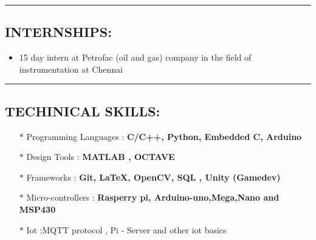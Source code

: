 \documentclass[10pts]{report}
\begin{document}
\par\noindent\rule{\textwidth}{0.1pt}
\begin{flushleft}
         \section*{INTERNSHIPS:}
              \begin{itemize}
                 \item 15 day intern at Petrofac (oil and gas) company in the field of instrumentation at Chennai
               \end{itemize}     
\end{flushleft}

\par\noindent\rule{\textwidth}{0.1pt}
\begin{flushleft}
         \section*{TECHINICAL SKILLS:}
              \begin{itemize}
                 \item[$\ast$]        Programming Languages       :  \textbf {C/C++, Python, Embedded C, Arduino} \\
                 \item[$\ast$]        Design Tools : \textbf {MATLAB , OCTAVE }\\
                 \item[$\ast$]        Frameworks : \textbf{Git, \LaTeX, OpenCV, SQL , Unity (Gamedev)}\\ 
                 \item[$\ast$]        Micro-controllers : \textbf{Rasperry pi, Arduino-uno,Mega,Nano and MSP430}\\   
                 \item[$\ast$]        Iot  :MQTT protocol , Pi - Server and other iot basics \\
               \end{itemize}     
\end{flushleft}
\end{document}
